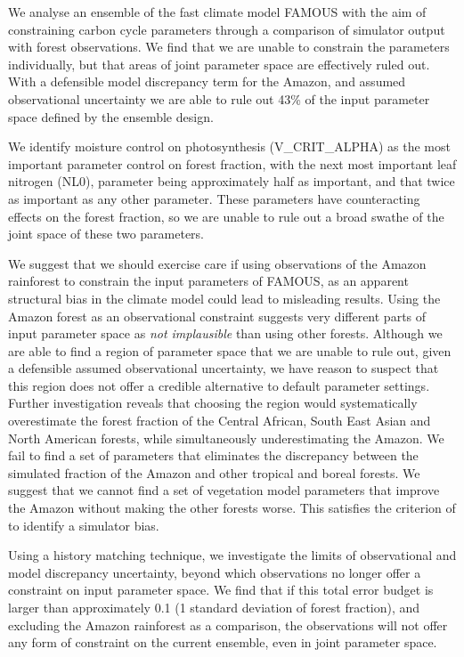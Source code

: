\documentclass[esd, article]{copernicus} %
\begin{document}
We analyse an ensemble of the fast climate model FAMOUS with the aim of constraining carbon cycle parameters through a comparison of simulator output with forest observations. We find that we are unable to constrain the parameters individually, but that areas of joint parameter space are effectively ruled out. With a defensible model discrepancy term for the Amazon, and assumed observational uncertainty we are able to rule out 43\% of the input parameter space defined by the ensemble design.

We identify moisture control on photosynthesis (V\_CRIT\_ALPHA) as the most important parameter control on forest fraction, with the next most important leaf nitrogen (NL0), parameter being approximately half as important, and that twice as important as any other parameter. These parameters have counteracting effects on the forest fraction, so we are unable to rule out a broad swathe of the joint space of these two parameters.

We suggest that we should exercise care if using observations of the Amazon rainforest to constrain the input parameters of FAMOUS, as an apparent structural bias in the climate model could lead to misleading results. Using the Amazon forest as an observational constraint suggests very different parts of input parameter space as \emph{not implausible} than using other forests. Although we are able to find a region of parameter space that we are unable to rule out, given a defensible assumed observational uncertainty, we have reason to suspect that this region does not offer a credible alternative to default parameter settings. Further investigation reveals that choosing the region would systematically overestimate the forest fraction of the Central African, South East Asian and North American forests, while simultaneously underestimating the Amazon. We fail to find a set of parameters that eliminates the discrepancy between the simulated fraction of the Amazon and other tropical and boreal forests. We suggest that we cannot find a set of vegetation model parameters that improve the Amazon without making the other forests worse. This satisfies the criterion of \cite{williamson2014identifying} to identify a simulator bias. 

Using a history matching technique, we investigate the limits of observational and model discrepancy uncertainty, beyond which observations no longer offer a constraint on input parameter space. We find that if this total error budget is larger than approximately 0.1 (1 standard deviation of forest fraction), and excluding the Amazon rainforest as a comparison, the observations will not offer any form of constraint on the current ensemble, even in joint parameter space.
\end{document}
